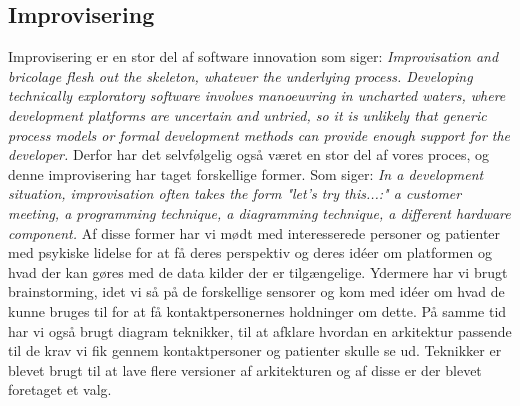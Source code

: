 \subsection{Improvisering}
Improvisering er en stor del af software innovation som \citet[side 56]{book:softwareinnovation} siger: \textit{Improvisation and bricolage flesh out the skeleton, whatever the underlying process. Developing technically exploratory software involves manoeuvring in uncharted waters, where development platforms are uncertain and untried, so it is unlikely that generic process models or formal development methods can provide enough support for the developer.}
Derfor har det selvfølgelig også været en stor del af vores proces, og denne improvisering har taget forskellige former.
Som \citet[side 56]{book:softwareinnovation} siger: \textit{In a development situation, improvisation often takes the form "let's try this...:" a customer meeting, a programming technique, a diagramming technique, a different hardware component.}
Af disse former har vi mødt med interesserede personer og patienter med psykiske lidelse for at få deres perspektiv og deres idéer om platformen og hvad der kan gøres med de data kilder der er tilgængelige. 
Ydermere har vi brugt brainstorming, idet vi så på de forskellige sensorer og kom med idéer om hvad de kunne bruges til for at få kontaktpersonernes holdninger om dette.
På samme tid har vi også brugt diagram teknikker, til at afklare hvordan en arkitektur passende til de krav vi fik gennem kontaktpersoner og patienter skulle se ud.
Teknikker er blevet brugt til at lave flere versioner af arkitekturen og af disse er der blevet foretaget et valg.